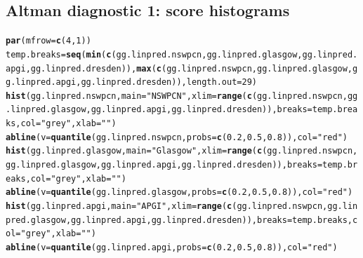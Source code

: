 \documentclass{article}\usepackage[]{graphicx}\usepackage[]{color}
\makeatletter
\newcommand{\hlnum}[1]{\textcolor[rgb]{0.686,0.059,0.569}{#1}}%
\newcommand{\hlstr}[1]{\textcolor[rgb]{0.192,0.494,0.8}{#1}}%
\newcommand{\hlstd}[1]{\textcolor[rgb]{0.345,0.345,0.345}{#1}}%
\newcommand{\hlkwb}[1]{\textcolor[rgb]{0.69,0.353,0.396}{#1}}%
\newcommand{\hlkwc}[1]{\textcolor[rgb]{0.333,0.667,0.333}{#1}}%
\newcommand{\hlkwd}[1]{\textcolor[rgb]{0.737,0.353,0.396}{\textbf{#1}}}%
\newenvironment{kframe}{%
 \def\at@end@of@kframe{}%
 \ifinner\ifhmode%
  \def\at@end@of@kframe{\end{minipage}}%
  \begin{minipage}{\columnwidth}%
 \fi\fi%
 \def\FrameCommand##1{\hskip\@totalleftmargin \hskip-\fboxsep
 \colorbox{shadecolor}{##1}\hskip-\fboxsep
     \hskip-\linewidth \hskip-\@totalleftmargin \hskip\columnwidth}%
 \MakeFramed {\advance\hsize-\width
   \@totalleftmargin\z@ \linewidth\hsize
   \@setminipage}}%
 {\par\unskip\endMakeFramed%
 \at@end@of@kframe}
\newenvironment{knitrout}{}{} %
\makeatother
\begin{document}
\subsection{Altman diagnostic 1: score histograms}
\begin{knitrout}
\color{fgcolor}\begin{kframe}
\begin{alltt}
\hlkwd{par}\hlstd{(}\hlkwc{mfrow} \hlstd{=} \hlkwd{c}\hlstd{(}\hlnum{4}\hlstd{,} \hlnum{1}\hlstd{))}
\hlstd{temp.breaks} \hlkwb{=} \hlkwd{seq}\hlstd{(}\hlkwd{min}\hlstd{(}\hlkwd{c}\hlstd{(gg.linpred.nswpcn, gg.linpred.glasgow, gg.linpred.apgi, gg.linpred.dresden)),} \hlkwd{max}\hlstd{(}\hlkwd{c}\hlstd{(gg.linpred.nswpcn, gg.linpred.glasgow, gg.linpred.apgi, gg.linpred.dresden)),} \hlkwc{length.out} \hlstd{=} \hlnum{29}\hlstd{)}
\hlkwd{hist}\hlstd{(gg.linpred.nswpcn,} \hlkwc{main} \hlstd{=} \hlstr{"NSWPCN"}\hlstd{,} \hlkwc{xlim} \hlstd{=} \hlkwd{range}\hlstd{(}\hlkwd{c}\hlstd{(gg.linpred.nswpcn, gg.linpred.glasgow, gg.linpred.apgi, gg.linpred.dresden)),} \hlkwc{breaks} \hlstd{= temp.breaks,} \hlkwc{col} \hlstd{=} \hlstr{"grey"}\hlstd{,} \hlkwc{xlab} \hlstd{=} \hlstr{""}\hlstd{)}
\hlkwd{abline}\hlstd{(}\hlkwc{v} \hlstd{=} \hlkwd{quantile}\hlstd{(gg.linpred.nswpcn,} \hlkwc{probs} \hlstd{=} \hlkwd{c}\hlstd{(}\hlnum{0.2}\hlstd{,} \hlnum{0.5}\hlstd{,} \hlnum{0.8}\hlstd{)),} \hlkwc{col} \hlstd{=} \hlstr{"red"}\hlstd{)}
\hlkwd{hist}\hlstd{(gg.linpred.glasgow,} \hlkwc{main} \hlstd{=} \hlstr{"Glasgow"}\hlstd{,} \hlkwc{xlim} \hlstd{=} \hlkwd{range}\hlstd{(}\hlkwd{c}\hlstd{(gg.linpred.nswpcn, gg.linpred.glasgow, gg.linpred.apgi, gg.linpred.dresden)),} \hlkwc{breaks} \hlstd{= temp.breaks,} \hlkwc{col} \hlstd{=} \hlstr{"grey"}\hlstd{,} \hlkwc{xlab} \hlstd{=} \hlstr{""}\hlstd{)}
\hlkwd{abline}\hlstd{(}\hlkwc{v} \hlstd{=} \hlkwd{quantile}\hlstd{(gg.linpred.glasgow,} \hlkwc{probs} \hlstd{=} \hlkwd{c}\hlstd{(}\hlnum{0.2}\hlstd{,} \hlnum{0.5}\hlstd{,} \hlnum{0.8}\hlstd{)),} \hlkwc{col} \hlstd{=} \hlstr{"red"}\hlstd{)}
\hlkwd{hist}\hlstd{(gg.linpred.apgi,} \hlkwc{main} \hlstd{=} \hlstr{"APGI"}\hlstd{,} \hlkwc{xlim} \hlstd{=} \hlkwd{range}\hlstd{(}\hlkwd{c}\hlstd{(gg.linpred.nswpcn, gg.linpred.glasgow, gg.linpred.apgi, gg.linpred.dresden)),} \hlkwc{breaks} \hlstd{= temp.breaks,} \hlkwc{col} \hlstd{=} \hlstr{"grey"}\hlstd{,} \hlkwc{xlab} \hlstd{=} \hlstr{""}\hlstd{)}
\hlkwd{abline}\hlstd{(}\hlkwc{v} \hlstd{=} \hlkwd{quantile}\hlstd{(gg.linpred.apgi,} \hlkwc{probs} \hlstd{=} \hlkwd{c}\hlstd{(}\hlnum{0.2}\hlstd{,} \hlnum{0.5}\hlstd{,} \hlnum{0.8}\hlstd{)),} \hlkwc{col} \hlstd{=} \hlstr{"red"}\hlstd{)}

\end{alltt}
\end{kframe}
\end{knitrout}
\end{document}
